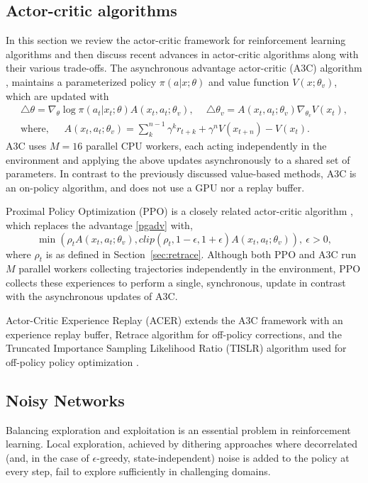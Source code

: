 \documentclass{article}
\begin{document}
\subsection{Actor-critic algorithms}\label{sec:ac}
In this section we review the actor-critic framework for reinforcement learning 
algorithms and then discuss 
recent advances in actor-critic algorithms along with their various trade-offs. 
The asynchronous advantage actor-critic (A3C) algorithm 
\citep{mnih2016asynchronous}, maintains a parameterized policy $\pi( a | x; 
\theta)$ and value function $V(x; \theta_v)$, which are updated with
\begin{eqnarray}
\triangle \theta = \nabla_\theta \log \pi(a_t | x_t; \theta) A(x_t, a_t;
\theta_v),\ \quad \triangle \theta_v = A(x_t, a_t; \theta_v) 
\nabla_{\theta_v} V(x_t),\\
\text{where, }\ \quad A(x_t, a_t; \theta_v) = \sum_k^{n-1} \gamma^k 
r_{t+k} + \gamma^n V(x_{t+n}) - V(x_t).\label{pgadv}
\end{eqnarray}
A3C uses $M = 16$ parallel CPU workers, each acting independently in the 
environment and applying the above updates asynchronously to a shared set of 
parameters. In contrast to the previously discussed value-based methods, A3C is 
an on-policy algorithm, and does not use a GPU nor a replay buffer. 

Proximal Policy Optimization (PPO) is a closely related actor-critic algorithm 
\citep{schulman2017proximal}, which replaces the advantage \eqref{pgadv} with,
$$\min(\rho_t A(x_t, a_t; \theta_v), clip(\rho_t, 1 - 
\epsilon, 1 + \epsilon) A(x_t, a_t; \theta_v)),\ \epsilon > 0,$$
where $\rho_t$ is as defined in Section~\ref{sec:retrace}. Although both PPO and 
A3C run $M$ parallel workers collecting 
trajectories independently in the environment, PPO collects these experiences to 
perform a single, synchronous, update in contrast 
with the asynchronous updates of A3C. 

Actor-Critic Experience Replay (ACER) extends the A3C framework with an 
experience replay buffer, Retrace algorithm for off-policy corrections, and 
the Truncated Importance Sampling Likelihood Ratio (TISLR) algorithm 
used for off-policy policy optimization \citep{wang2017sample}.

\iffalse 
\subsection{Noisy Networks}\label{sec:noisy}
Balancing exploration and exploitation is an essential problem in reinforcement 
learning.
Local exploration, achieved by dithering approaches where 
decorrelated (and, in the case of  $\epsilon$-greedy, state-independent) noise 
is added to the policy at every step, fail to explore sufficiently in 
challenging domains.
\end{document}
